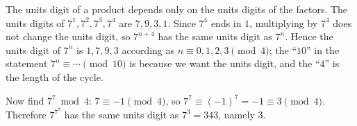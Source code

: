 The units digit of a product depends only on the units digits of the factors. The units digits of $7^1,7^2,7^3,7^4$ are $7,9,3,1$. Since $7^4$ ends in $1$, multiplying by $7^4$ does not change the units digit, so $7^{n+4}$ has the same units digit as $7^n$. Hence the units digit of $7^n$ is $1,7,9,3$ according as $n\equiv0,1,2,3\pmod4$; the ``$10$'' in the statement $7^n\equiv\cdots\pmod{10}$ is because we want the units digit, and the ``$4$'' is the length of the cycle.

Now find $7^7\bmod4$: $7\equiv-1\pmod4$, so $7^7\equiv(-1)^7=-1\equiv3\pmod4$. Therefore $7^{7^7}$ has the same units digit as $7^3=343$, namely $\boxed{3}$.
